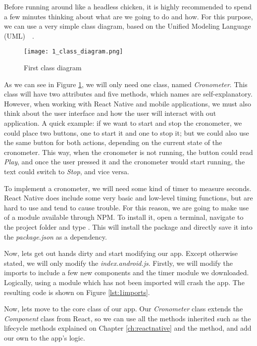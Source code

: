 Before running around like a headless chicken, it is highly recommended to spend a few minutes thinking about what are we going to do and how. For this purpose, we can use a very simple class diagram, based on the Unified Modeling Language (UML)~\cite{uml}~\cite{umlbook}.

\begin{figure}[H]
	\centering
	\texttt{[image: 1\_class\_diagram.png]}
	\caption{First class diagram\label{fig:1rnclassdiagram}}
\end{figure}

As we can see in Figure \ref{fig:1rnclassdiagram}, we will only need one class, named \textit{Cronometer}. This class will have two attributes and five methods, which names are self-explanatory. However, when working with React Native and mobile applications, we must also think about the user interface and how the user will interact with out application. A quick example: if we want to start and stop the cronometer, we could place two buttons, one to start it and one to stop it; but we could also use the same button for both actions, depending on the current state of the cronometer. This way, when the cronometer is not running, the button could read \textit{Play}, and once the user pressed it and the cronometer would start running, the text could switch to \textit{Stop}, and vice versa.

To implement a cronometer, we will need some kind of timer to measure seconds. React Native does include some very basic and low-level timing functions, but are hard to use and tend to cause trouble. For this reason, we are going to make use of a module available through NPM. To install it, open a terminal, navigate to the project folder and type . This will install the package and directly save it into the \textit{package.json} as a dependency.

Now, lets get out hands dirty and start modifying our app. Except otherwise stated, we will only modify the \textit{index.android.js}. Firstly, we will modify the imports to include a few new components and the timer module we downloaded. Logically, using a module which has not been imported will crash the app. The resulting code is shown on Figure \ref{lst:1imports}.

\lstset{style=myhtml}


Now, lets move to the core class of our app. Our \textit{Cronometer} class extends the \textit{Component} class from React, so we can use all the methods inherited such as the lifecycle methods explained on Chapter \ref{ch:reactnative} and the  method, and add our own to the app's logic.

